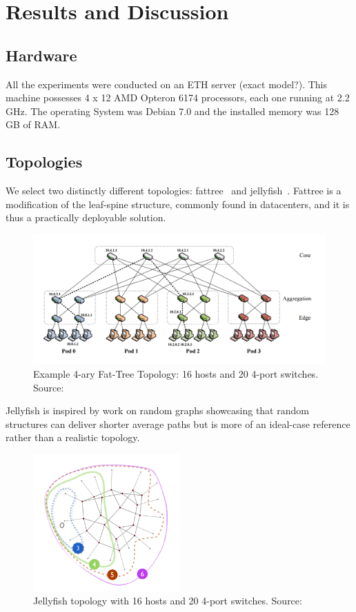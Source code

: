 \documentclass[11pt,singlecolumn]{scrartcl}
\begin{document}

\section{Results and Discussion}

\subsection{Hardware}
All the experiments were conducted on an ETH server (exact model?). This machine possesses 4 x 12 AMD Opteron 6174 processors, each one running at 2.2 GHz. The operating System was Debian 7.0 and the installed memory was 128 GB of RAM.
\subsection{Topologies}
We select two distinctly different topologies: fattree~\cite{FatTree} and jellyfish~\cite{Jellyfish}. Fattree is a modification of the leaf-spine structure, commonly found in datacenters, and it is thus a practically deployable solution.
\begin{figure}[H]
\includegraphics[width=1\textwidth]{fattree}
\caption[Fat-Tree Topology Example]{Example 4-ary Fat-Tree Topology: 16 hosts and 20 4-port switches. Source: \protect\cite{FatTree}}
\end{figure}
Jellyfish is inspired by work on random graphs showcasing that random structures can deliver shorter average paths but is more of an ideal-case reference rather than a realistic topology.
\begin{figure}[H]
\includegraphics[width=0.5\textwidth]{jelly}
\caption[Jellyfish Topology Example]{Jellyfish topology with 16 hosts and 20 4-port switches. Source: \protect\cite{Jellyfish}}
\end{figure}
\end{document}
